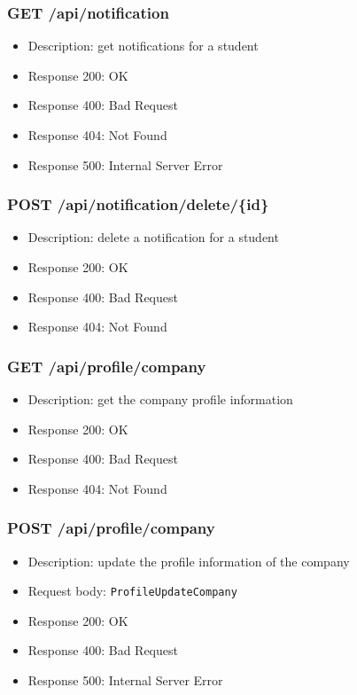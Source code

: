\subsubsection{GET /api/notification}
\begin{itemize}
    \item Description: get notifications for a student
    \item Response 200: OK
    \item Response 400: Bad Request
    \item Response 404: Not Found
    \item Response 500: Internal Server Error
\end{itemize}

\subsubsection{POST /api/notification/delete/\{id\}}
\begin{itemize}
    \item Description: delete a notification for a student
    \item Response 200: OK
    \item Response 400: Bad Request
    \item Response 404: Not Found
\end{itemize}

\subsubsection{GET /api/profile/company}
\begin{itemize}
    \item Description: get the company profile information
    \item Response 200: OK
    \item Response 400: Bad Request
    \item Response 404: Not Found
\end{itemize}

\subsubsection{POST /api/profile/company}
\begin{itemize}
    \item Description: update the profile information of the company
    \item Request body: \verb|ProfileUpdateCompany|
    \item Response 200: OK
    \item Response 400: Bad Request
    \item Response 500: Internal Server Error
\end{itemize}

